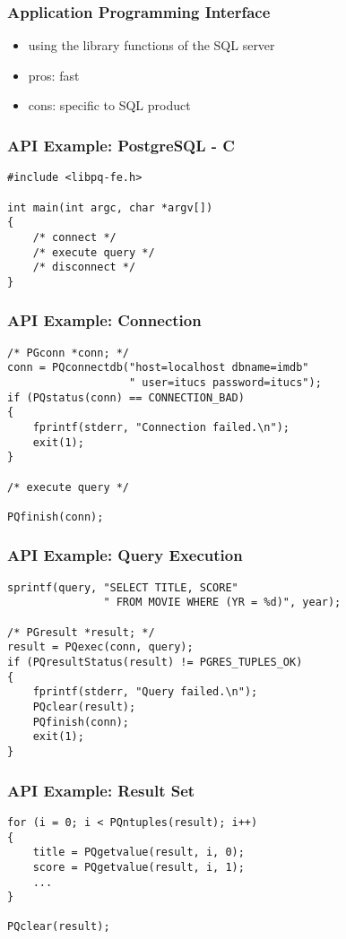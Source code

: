 \documentclass[dvipsnames]{beamer}
\theoremstyle{plain}
\begin{document}
\begin{frame}
  \frametitle{Application Programming Interface}

  \begin{itemize}
    \item using the library functions of the SQL server

    \bigskip
    \item pros: fast
    \item cons: specific to SQL product
  \end{itemize}
\end{frame}

\begin{frame}[fragile]
  \frametitle{API Example: PostgreSQL - C}

  \begin{lstlisting}
#include <libpq-fe.h>

int main(int argc, char *argv[])
{
    /* connect */
    /* execute query */
    /* disconnect */
}
  \end{lstlisting}
\end{frame}

\begin{frame}[fragile]
  \frametitle{API Example: Connection}

  \begin{lstlisting}
/* PGconn *conn; */
conn = PQconnectdb("host=localhost dbname=imdb"
                   " user=itucs password=itucs");
if (PQstatus(conn) == CONNECTION_BAD)
{
    fprintf(stderr, "Connection failed.\n");
    exit(1);
}

/* execute query */

PQfinish(conn);
  \end{lstlisting}
\end{frame}

\begin{frame}[fragile]
  \frametitle{API Example: Query Execution}

  \begin{lstlisting}
sprintf(query, "SELECT TITLE, SCORE"
               " FROM MOVIE WHERE (YR = %d)", year);

/* PGresult *result; */
result = PQexec(conn, query);
if (PQresultStatus(result) != PGRES_TUPLES_OK)
{
    fprintf(stderr, "Query failed.\n");
    PQclear(result);
    PQfinish(conn);
    exit(1);
}
  \end{lstlisting}
\end{frame}

\begin{frame}[fragile]
  \frametitle{API Example: Result Set}

  \begin{lstlisting}
for (i = 0; i < PQntuples(result); i++)
{
    title = PQgetvalue(result, i, 0);
    score = PQgetvalue(result, i, 1);
    ...
}

PQclear(result);
  \end{lstlisting}
\end{frame}
\end{document}
